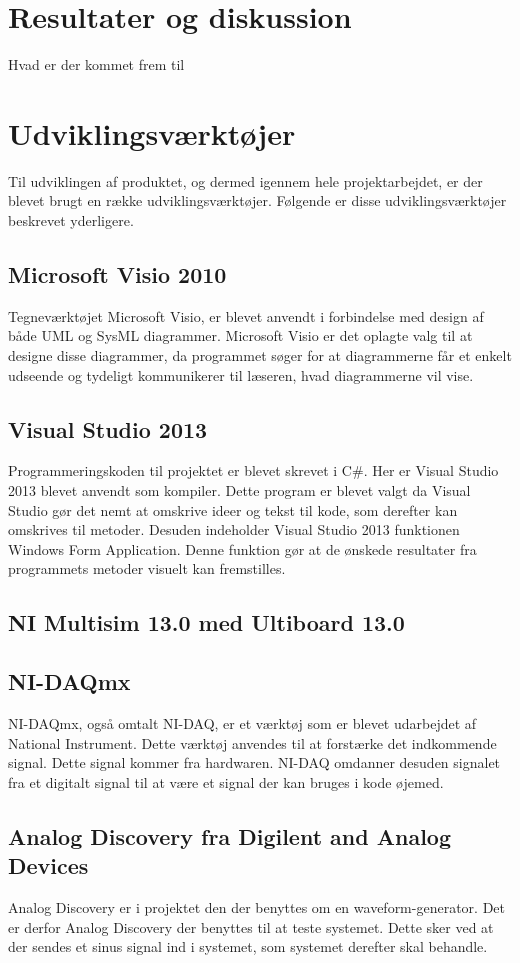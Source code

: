 	
	
\section{Resultater og diskussion}
Hvad er der kommet frem til
\section{Udviklingsværktøjer}
Til udviklingen af produktet, og dermed igennem hele projektarbejdet, er der blevet brugt en række udviklingsværktøjer. Følgende er disse udviklingsværktøjer beskrevet yderligere.
\subsection{Microsoft Visio 2010}
Tegneværktøjet Microsoft Visio, er blevet anvendt i forbindelse med design af både UML og SysML diagrammer. Microsoft Visio er det oplagte valg til at designe disse diagrammer, da programmet søger for at diagrammerne får et enkelt udseende og tydeligt kommunikerer til læseren, hvad diagrammerne vil vise.
\subsection{Visual Studio 2013}
Programmeringskoden til projektet er blevet skrevet i C\#. Her er Visual Studio 2013 blevet anvendt som kompiler. Dette program er blevet valgt da Visual Studio gør det nemt at omskrive ideer og tekst til kode, som derefter kan omskrives til metoder. Desuden indeholder Visual Studio 2013 funktionen Windows Form Application. Denne funktion gør at de ønskede resultater fra programmets metoder visuelt kan fremstilles.
\subsection{NI Multisim 13.0 med Ultiboard 13.0}

\subsection{NI-DAQmx}
NI-DAQmx, også omtalt NI-DAQ, er et værktøj som er blevet udarbejdet af National Instrument. Dette værktøj anvendes til at forstærke det indkommende signal. Dette signal kommer fra hardwaren. NI-DAQ omdanner desuden signalet fra et digitalt signal til at være et signal der kan bruges i kode øjemed. 
\subsection{Analog Discovery fra Digilent and Analog Devices}
Analog Discovery er i projektet den der benyttes om en waveform-generator. Det er derfor Analog Discovery der benyttes til at teste systemet. Dette sker ved at der sendes et sinus signal ind i systemet, som systemet derefter skal behandle.
